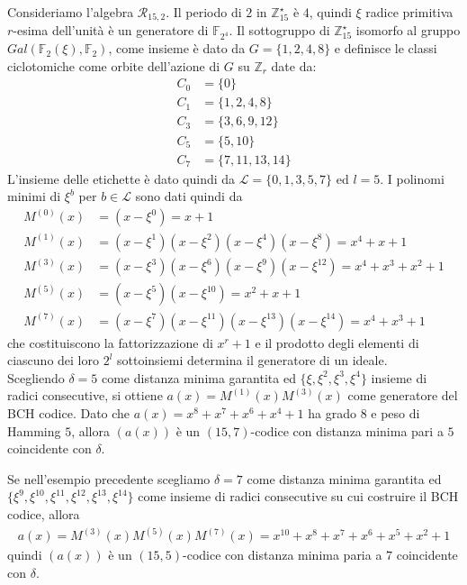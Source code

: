 \begin{esempio}
   Consideriamo l'algebra $\mathcal{R}_{15,2}$. Il periodo di $2$ in $\mathbb{Z}_{15}^{\star}$ è $4$, quindi $\xi$ radice primitiva $r$-esima dell'unità è un generatore di $\mathbb{F}_{2^4}$. Il sottogruppo di $\mathbb{Z}_{15}^{\star}$ isomorfo al gruppo $Gal(\mathbb{F}_{2}(\xi), \mathbb{F}_{2})$, come insieme è dato da $G = \lbrace 1,2,4,8 \rbrace$ e definisce le classi ciclotomiche come orbite dell'azione di $G$ su $\mathbb{Z}_{r}$ date da:
   \begin{align*}
      C_{0} &= \lbrace 0 \rbrace \\
      C_{1} &= \lbrace 1,2,4,8 \rbrace \\
      C_{3} &= \lbrace 3,6,9,12 \rbrace \\
      C_{5} &= \lbrace 5, 10 \rbrace \\
      C_{7} &= \lbrace 7,11,13,14 \rbrace 
   \end{align*}
   L'insieme delle etichette è dato quindi da $\mathscr{L} = \lbrace 0,1,3,5,7 \rbrace $ ed $l = 5$. I polinomi minimi di $\xi^{b}$ per $b\in \mathscr{L}$ sono dati quindi da
   \begin{align*}
      M^{(0)}(x) &= (x - \xi^{0}) = x + 1\\
      M^{(1)}(x) &=  (x - \xi^{1})(x - \xi^{2})(x - \xi^{4})(x - \xi^{8}) = x^4 + x + 1\\
      M^{(3)}(x) &=  (x - \xi^{3})(x - \xi^{6})(x - \xi^{9})(x - \xi^{12}) = x^4 + x^3 + x^2 + 1 \\
      M^{(5)}(x) &=  (x - \xi^{5})(x - \xi^{10}) = x^2 + x + 1\\
      M^{(7)}(x) &=  (x - \xi^{7})(x - \xi^{11})(x - \xi^{13})(x - \xi^{14}) = x^4 + x^3 + 1 
   \end{align*}
   che costituiscono la fattorizzazione di $x^r + 1$ e il prodotto degli elementi di ciascuno dei loro $2^{l}$ sottoinsiemi determina il generatore di un ideale. \\
   Scegliendo $\delta = 5$ come distanza minima garantita ed $\lbrace \xi, \xi^2, \xi^3, \xi^4 \rbrace$ insieme di radici consecutive, si ottiene $a(x) = M^{(1)}(x) M^{(3)}(x) $ come generatore del BCH codice. Dato che $a(x) = x^8 + x^7 + x^6 + x^4 + 1$ ha grado $8$ e peso di Hamming $5$, allora $(a(x))$ è un $(15,7)$-codice con distanza minima pari a $5$ coincidente con $\delta$.  
\end{esempio}

\begin{esempio}
   Se nell'esempio precedente scegliamo $\delta = 7$ come distanza minima garantita ed $\lbrace \xi^{9}, \xi^{10}, \xi^{11}, \xi^{12}, \xi^{13}, \xi^{14} \rbrace$ come insieme di radici consecutive su cui costruire il BCH codice, allora 
   \begin{align*}
      a(x) = M^{(3)}(x) M^{(5)}(x) M^{(7)}(x) = x^{10}+ x^8 + x^7 + x^6 + x^5 + x^2 + 1
   \end{align*}
   quindi $(a(x))$ è un $(15,5)$-codice con distanza minima paria a $7$ coincidente con $\delta$.
\end{esempio}


